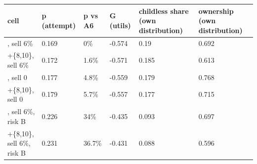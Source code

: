 \begingroup\small
\setlength{\tabcolsep}{3pt}
\renewcommand{\arraystretch}{1.04}
\begin{tabularx}{\linewidth}{XXXXXX}
\toprule
cell & p (attempt) & p vs A6 & G (utils) & childless share (own distribution) & ownership (own distribution) \\
\midrule
[0,6], sell 6\% & 0.169 & 0\% & -0.574 & 0.19 & 0.692 \\
[0,6]+\{8,10\}, sell 6\% & 0.172 & 1.6\% & -0.571 & 0.185 & 0.613 \\
[0,6], sell 0 & 0.177 & 4.8\% & -0.559 & 0.179 & 0.768 \\
[0,6]+\{8,10\}, sell 0 & 0.179 & 5.7\% & -0.557 & 0.177 & 0.715 \\
[0,6], sell 6\%, risk B & 0.226 & 34\% & -0.435 & 0.093 & 0.697 \\
[0,6]+\{8,10\}, sell 6\%, risk B & 0.231 & 36.7\% & -0.431 & 0.088 & 0.596 \\
\bottomrule
\end{tabularx}
\endgroup
